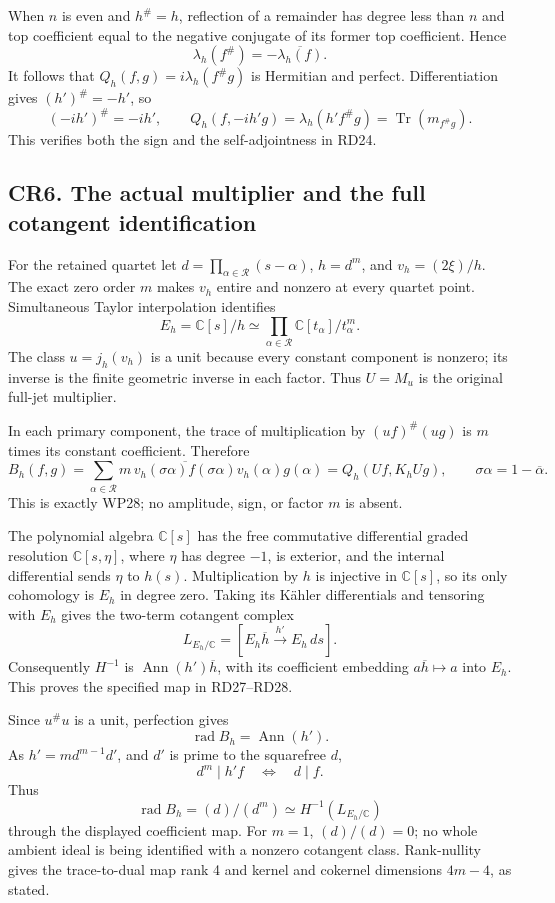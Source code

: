 \documentclass[
]{article}
\begin{document}
When \(n\) is even and \(h^\#=h\), reflection of a remainder has degree
less than \(n\) and top coefficient equal to the negative conjugate of
its former top coefficient. Hence \[
\lambda_h(f^\#)=-\overline{\lambda_h(f)}.
\] It follows that \(Q_h(f,g)=i\lambda_h(f^\#g)\) is Hermitian and
perfect. Differentiation gives \((h')^\#=-h'\), so \[
(-ih')^\#=-ih',\qquad
Q_h(f,-ih'g)=\lambda_h(h'f^\#g)=\operatorname{Tr}(m_{f^\#g}).
\] This verifies both the sign and the self-adjointness in RD24.

\subsection{CR6. The actual multiplier and the full cotangent
identification}\label{cr6.-the-actual-multiplier-and-the-full-cotangent-identification}

For the retained quartet let
\(d=\prod_{\alpha\in\mathcal R}(s-\alpha)\), \(h=d^m\), and
\(v_h=(2\xi)/h\). The exact zero order \(m\) makes \(v_h\) entire and
nonzero at every quartet point. Simultaneous Taylor interpolation
identifies \[
E_h=\mathbb C[s]/h\simeq\prod_{\alpha\in\mathcal R}\mathbb C[t_\alpha]/t_\alpha^m.
\] The class \(u=j_h(v_h)\) is a unit because every constant component
is nonzero; its inverse is the finite geometric inverse in each factor.
Thus \(U=M_u\) is the original full-jet multiplier.

In each primary component, the trace of multiplication by
\((uf)^\#(ug)\) is \(m\) times its constant coefficient. Therefore \[
B_h(f,g)=\sum_{\alpha\in\mathcal R}
m\,\overline{v_h(\sigma\alpha)f(\sigma\alpha)}v_h(\alpha)g(\alpha)
=Q_h(Uf,K_hUg),
\qquad \sigma\alpha=1-\overline\alpha.
\] This is exactly WP28; no amplitude, sign, or factor \(m\) is absent.

The polynomial algebra \(\mathbb C[s]\) has the free commutative
differential graded resolution \(\mathbb C[s,\eta]\), where \(\eta\) has
degree \(-1\), is exterior, and the internal differential sends \(\eta\)
to \(h(s)\). Multiplication by \(h\) is injective in \(\mathbb C[s]\),
so its only cohomology is \(E_h\) in degree zero. Taking its Kähler
differentials and tensoring with \(E_h\) gives the two-term cotangent
complex \[
L_{E_h/\mathbb C}=
[E_h\overline h\xrightarrow{h'}E_h\,ds].
\] Consequently \(H^{-1}\) is \(\operatorname{Ann}(h')\overline h\),
with its coefficient embedding \(a\overline h\mapsto a\) into \(E_h\).
This proves the specified map in RD27--RD28.

Since \(u^\#u\) is a unit, perfection gives \[
\operatorname{rad}B_h=\operatorname{Ann}(h').
\] As \(h'=m d^{m-1}d'\), and \(d'\) is prime to the squarefree \(d\),
\[
d^m\mid h'f\quad\Longleftrightarrow\quad d\mid f.
\] Thus \[
\operatorname{rad}B_h=(d)/(d^m)
\simeq H^{-1}(L_{E_h/\mathbb C})
\] through the displayed coefficient map. For \(m=1\), \((d)/(d)=0\); no
whole ambient ideal is being identified with a nonzero cotangent class.
Rank-nullity gives the trace-to-dual map rank 4 and kernel and cokernel
dimensions \(4m-4\), as stated.
\end{document}
